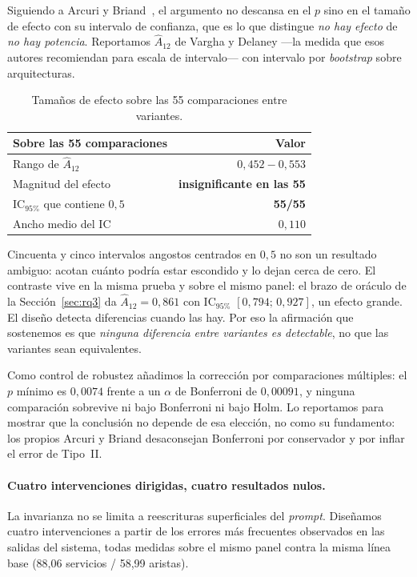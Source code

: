\documentclass[a4paper, twocolumn, 10pt]{IEEEtran}
\begin{document}
Siguiendo a Arcuri y Briand~\cite{Arcuri2011StatisticalSE}, el argumento
no descansa en el $p$ sino en el tamaño de efecto con su intervalo de
confianza, que es lo que distingue \emph{no hay efecto} de \emph{no hay
potencia}. Reportamos $\hat{A}_{12}$ de Vargha y Delaney ---la medida que
esos autores recomiendan para escala de intervalo--- con intervalo por
\emph{bootstrap} sobre arquitecturas.

\begin{table}[H]
\centering\small
\caption{Tamaños de efecto sobre las 55 comparaciones entre variantes.}
\label{tab:a12}
\begin{tabular}{lr}
\toprule
Sobre las 55 comparaciones & Valor\\
\midrule
Rango de $\hat{A}_{12}$            & $0{,}452 - 0{,}553$\\
Magnitud del efecto                & \textbf{insignificante en las 55}\\
IC$_{95\%}$ que contiene $0{,}5$   & \textbf{55/55}\\
Ancho medio del IC                 & $0{,}110$\\
\bottomrule
\end{tabular}
\end{table}

Cincuenta y cinco intervalos angostos centrados en $0{,}5$ no son un resultado ambiguo: acotan cuánto podría estar escondido y lo dejan cerca de cero. El contraste vive en la misma prueba y sobre el mismo panel: el brazo de oráculo de la Sección~\ref{sec:rq3} da
$\hat{A}_{12}=0{,}861$ con IC$_{95\%}$ $[0{,}794;\,0{,}927]$, un efecto grande. El diseño detecta diferencias cuando las hay. Por eso la afirmación que sostenemos es que \emph{ninguna diferencia entre variantes es detectable}, no que las variantes sean equivalentes.

Como control de robustez añadimos la corrección por comparaciones
múltiples: el $p$ mínimo es $0{,}0074$ frente a un $\alpha$ de Bonferroni de $0{,}00091$, y ninguna comparación sobrevive ni bajo Bonferroni ni bajo Holm. Lo reportamos para mostrar que la conclusión no depende de esa elección, no como su fundamento: los propios Arcuri y Briand desaconsejan Bonferroni por conservador y por inflar el error de Tipo~II.

\paragraph{Cuatro intervenciones dirigidas, cuatro resultados nulos.}
La invarianza no se limita a reescrituras superficiales del
\emph{prompt}. Diseñamos cuatro intervenciones a partir de los errores
más frecuentes observados en las salidas del sistema, todas medidas
sobre el mismo panel contra la misma línea base (88,06 servicios /
58,99 aristas).
\end{document}
